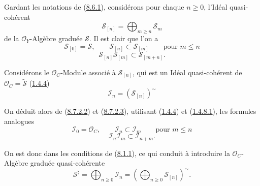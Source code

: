 \begin{env}[8.7.2]
\label{II.8.7.2-fr}
Gardant les notations de (\hyperref[II.8.6.1-fr]{8.6.1}), considérons pour
chaque $n\geqslant 0$, l'Idéal quasi-cohérent
\begin{equation}
\label{II.8.7.2.1-fr}
  \mathcal{S}_{[n]}=\bigoplus_{m\geqslant n}\mathcal{S}_m
\tag{8.7.2.1}
\end{equation}
de la $\mathcal{O}_Y$-Algèbre graduée $\mathcal{S}$. Il est clair que l'on a
\begin{equation}
\label{II.8.7.2.2-fr}
  \mathcal{S}_{[0]}=\mathcal{S},\qquad
  \mathcal{S}_{[n]}\subset\mathcal{S}_{[m]}
  \qquad\text{pour }m\leqslant n
\tag{8.7.2.2}
\end{equation}
\begin{equation}
\label{II.8.7.2.3-fr}
  \mathcal{S}_{[n]}\mathcal{S}_{[m]}\subset\mathcal{S}_{[m+n]}.
\tag{8.7.2.3}
\end{equation}

Considérons le $\mathcal{O}_C$-Module associé à $\mathcal{S}_{[n]}$, qui est un
Idéal quasi-cohérent de $\mathcal{O}_C=\widetilde{\mathcal{S}}$
(\hyperref[II.1.4.4-fr]{1.4.4})
\begin{equation}
\label{II.8.7.2.4-fr}
  \mathcal{I}_n=(\mathcal{S}_{[n]})^{\sim}
\tag{8.7.2.4}
\end{equation}

On déduit alors de (\hyperref[II.8.7.2.2-fr]{8.7.2.2}) et
(\hyperref[II.8.7.2.3-fr]{8.7.2.3}), utilisant
(\hyperref[II.1.4.4-fr]{1.4.4}) et (\hyperref[II.1.4.8.1-fr]{1.4.8.1}),
les formules analogues
\begin{equation}
\label{II.8.7.2.5-fr}
  \mathcal{I}_0=\mathcal{O}_C,\qquad
  \mathcal{I}_n\subset\mathcal{I}_m
  \qquad\text{pour }m\leqslant n
\tag{8.7.2.5}
\end{equation}
\begin{equation}
\label{II.8.7.2.6-fr}
  \mathcal{I}_n\mathcal{I}_m\subset\mathcal{I}_{n+m}.
\tag{8.7.2.6}
\end{equation}

On est donc dans les conditions de (\hyperref[II.8.1.1-fr]{8.1.1}), ce qui
conduit à introduire la $\mathcal{O}_C$-Algèbre graduée quasi-cohérente
\begin{equation}
\label{II.8.7.2.7-fr}
  \mathcal{S}^{\natural}
  =\bigoplus_{n\geqslant 0}\mathcal{I}_n
  =\left(\bigoplus_{n\geqslant 0}\mathcal{S}_{[n]}\right)^{\sim}.
\tag{8.7.2.7}
\end{equation}
\end{env}

